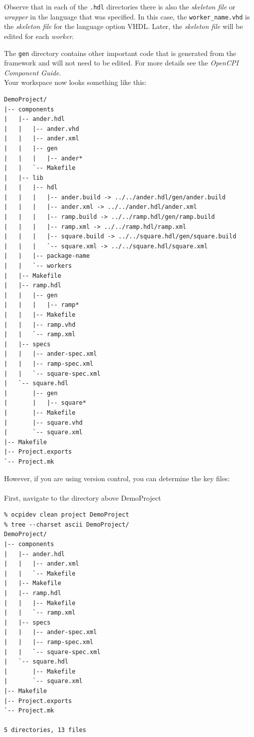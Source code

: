 Observe that in each of the \verb+.hdl+ directories there is also the \textit{skeleton file} or \textit{wrapper} in the language that was specified. In this case, the \verb+worker_name.vhd+ is the \textit{skeleton file} for the language option VHDL. Later, the \textit{skeleton file} will be edited for each \textit{worker}.\newline

The \verb+gen+ directory contains other important code that is generated from the framework and will not need to be edited. For more details see the \textit{OpenCPI Component Guide}.\\

\bstart
Your workspace now looks something like this:
\begin{verbatim}
DemoProject/
|-- components
|   |-- ander.hdl
|   |   |-- ander.vhd
|   |   |-- ander.xml
|   |   |-- gen
|   |   |   |-- ander*
|   |   `-- Makefile
|   |-- lib
|   |   |-- hdl
|   |   |   |-- ander.build -> ../../ander.hdl/gen/ander.build
|   |   |   |-- ander.xml -> ../../ander.hdl/ander.xml
|   |   |   |-- ramp.build -> ../../ramp.hdl/gen/ramp.build
|   |   |   |-- ramp.xml -> ../../ramp.hdl/ramp.xml
|   |   |   |-- square.build -> ../../square.hdl/gen/square.build
|   |   |   `-- square.xml -> ../../square.hdl/square.xml
|   |   |-- package-name
|   |   `-- workers
|   |-- Makefile
|   |-- ramp.hdl
|   |   |-- gen
|   |   |   |-- ramp*
|   |   |-- Makefile
|   |   |-- ramp.vhd
|   |   `-- ramp.xml
|   |-- specs
|   |   |-- ander-spec.xml
|   |   |-- ramp-spec.xml
|   |   `-- square-spec.xml
|   `-- square.hdl
|       |-- gen
|       |   |-- square*
|       |-- Makefile
|       |-- square.vhd
|       `-- square.xml
|-- Makefile
|-- Project.exports
`-- Project.mk
\end{verbatim}
\bend
\bstart
However, if you are using version control, you can determine the key files:
\\\\
First, navigate to the directory above DemoProject
\begin{verbatim}
% ocpidev clean project DemoProject
% tree --charset ascii DemoProject/
DemoProject/
|-- components
|   |-- ander.hdl
|   |   |-- ander.xml
|   |   `-- Makefile
|   |-- Makefile
|   |-- ramp.hdl
|   |   |-- Makefile
|   |   `-- ramp.xml
|   |-- specs
|   |   |-- ander-spec.xml
|   |   |-- ramp-spec.xml
|   |   `-- square-spec.xml
|   `-- square.hdl
|       |-- Makefile
|       `-- square.xml
|-- Makefile
|-- Project.exports
`-- Project.mk

5 directories, 13 files
\end{verbatim}
\bend

